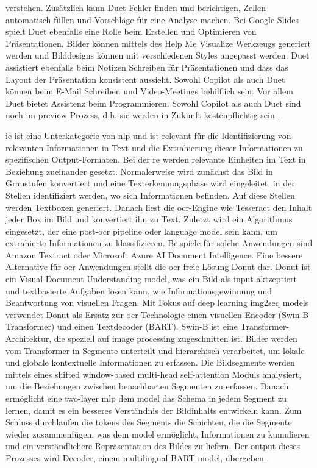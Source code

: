 verstehen. Zusätzlich kann Duet Fehler finden und berichtigen, Zellen automatisch füllen und Vorschläge für eine Analyse machen. Bei Google Slides spielt Duet ebenfalls eine Rolle beim Erstellen und Optimieren von Präsentationen. Bilder können mittels des Help Me Visualize Werkzeugs generiert werden und Bilddesigns können mit verschiedenen Styles angepasst werden. Duet assistiert ebenfalls beim Notizen Schreiben für Präsentationen und dass das Layout der Präsentation konsistent aussieht. Sowohl Copilot als auch Duet können beim E-Mail Schreiben und Video-Meetings behilflich sein. Vor allem Duet bietet Assistenz beim Programmieren. Sowohl Copilot als auch Duet sind noch im preview Prozess, d.h. sie werden in Zukunft kostenpflichtig sein \cite{copilot-duet}. 

\gls{ie} ist eine Unterkategorie von \gls{nlp} und ist relevant für die Identifizierung von relevanten Informationen in Text und die Extrahierung dieser Informationen zu spezifischen Output-Formaten. Bei der \gls{re} werden relevante Einheiten im Text in Beziehung zueinander gesetzt. Normalerweise wird zunächst das Bild in Graustufen konvertiert und eine Texterkennungsphase wird eingeleitet, in der Stellen identifiziert werden, wo sich Informationen befinden. Auf diese Stellen werden Textboxen generiert. Danach liest die \gls{ocr}-Engine wie Tesseract den Inhalt jeder Box im Bild und konvertiert ihn zu Text. Zuletzt wird ein Algorithmus eingesetzt, der eine post-\gls{ocr} pipeline oder language model sein kann, um extrahierte Informationen zu klassifizieren. Beispiele für solche Anwendungen sind Amazon Textract oder Microsoft Azure AI Document Intelligence. Eine bessere Alternative für \gls{ocr}-Anwendungen stellt die \gls{ocr}-freie Lösung Donut dar. Donut ist ein Visual Document Understanding model, was ein Bild als input aktzeptiert und textbasierte Aufgaben lösen kann, wie Informationsgewinnung und Beantwortung von visuellen Fragen. Mit Fokus auf deep learning img2seq models verwendet Donut als Ersatz zur \gls{ocr}-Technologie einen visuellen Encoder (Swin-B Transformer) und einen Textdecoder (BART). Swin-B ist eine Transformer-Architektur, die speziell auf image processing zugeschnitten ist. Bilder werden vom Transformer in Segmente unterteilt und hierarchisch verarbeitet, um lokale und globale kontextuelle Informationen zu erfassen. Die Bildsegmente werden mittels eines shifted window-based multi-head self-attention Moduls analysiert, um die Beziehungen zwischen benachbarten Segmenten zu erfassen. Danach ermöglicht eine two-layer \gls{mlp} dem model das Schema in jedem Segment zu lernen, damit es ein besseres Verständnis der Bildinhalts entwickeln kann. Zum Schluss durchlaufen die tokens des Segments die Schichten, die die Segmente wieder zusammenfügen, was dem model ermöglicht, Informationen zu kumulieren und ein verständlichere Repräsentation des Bildes zu liefern. Der output dieses Prozesses wird Decoder, einem multilingual BART model, übergeben \cite{transformers-ocr}. \\

